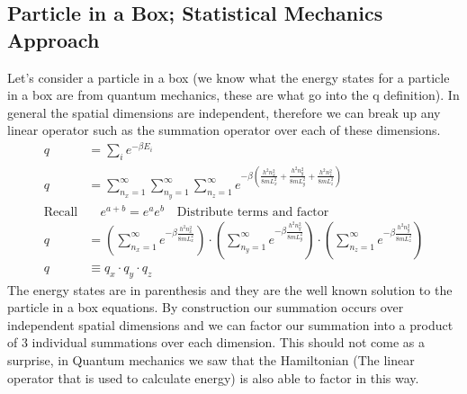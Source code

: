 \documentclass{article}
\begin{document}
\subsection*{Particle in a Box; Statistical Mechanics Approach}
 Let's consider a particle in a box (we know what the energy states for a particle in a box are from quantum mechanics, these are what go into the q definition). 
 In general the spatial dimensions are independent, therefore we can break up any linear operator such as the summation operator over each of these dimensions. 
 \begin{equation}
 \begin{split}
     q &= \sum_i e^{-\beta E_i} \\
     q &= \sum_{n_x = 1}^\infty  \sum_{n_y = 1}^\infty  \sum_{n_z = 1}^\infty e^{-\beta \left ( \frac{h^2n_x^2}{8mL_x^2} + \frac{h^2n_y^2}{8mL_y^2} + \frac{h^2n_z^2}{8mL_z^2} \right )} \\
     \text{Recall}& \quad  e^{a+b} = e^ae^b \quad \text{Distribute terms and factor} \\
     q &= \left ( \sum_{n_x=1}^\infty e^{-\beta \frac{h^2 n_x^2}{8mL_x^2}} \right ) \cdot \left ( \sum_{n_y=1}^\infty e^{-\beta \frac{h^2 n_y^2}{8mL_y^2}} \right ) \cdot \left ( \sum_{n_z=1}^\infty e^{-\beta \frac{h^2 n_y^2}{8mL_z^2}} \right ) \\
     q &\equiv q_x \cdot q_y \cdot q_z
     \end{split}
 \end{equation}
 The energy states are in parenthesis and they are the well known solution to the particle in a box equations. 
 By construction our summation occurs over independent spatial dimensions and we can factor our summation into a product of 3 individual summations over each dimension. 
 This should not come as a surprise, in Quantum mechanics we saw that the Hamiltonian (The linear operator that is used to calculate energy) is also able to factor in this way. 
 
\end{document}
